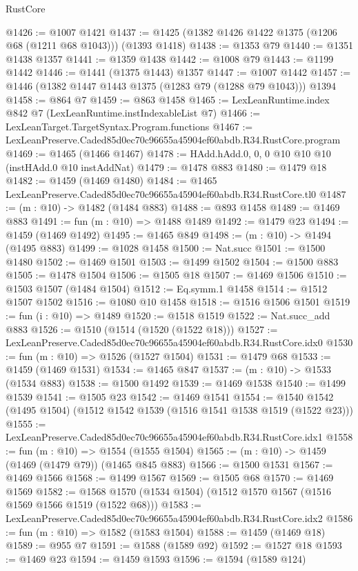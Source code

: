 \begin{lexlean}{RustCore}
\begin{coremodule}
@1426 := @1007 @1421
@1437 := @1425 (@1382 @1426 @1422 @1375 (@1206 @68 (@1211 @68 @1043))) (@1393 @1418)
@1438 := @1353 @79
@1440 := @1351 @1438 @1357
@1441 := @1359 @1438
@1442 := @1008 @79
@1443 := @1199 @1442
@1446 := @1441 (@1375 @1443) @1357
@1447 := @1007 @1442
@1457 := @1446 (@1382 @1447 @1443 @1375 (@1283 @79 (@1288 @79 @1043))) @1394
@1458 := @864 @7
@1459 := @863 @1458
@1465 := LexLeanRuntime.index @842 @7 (LexLeanRuntime.instIndexableList @7)
@1466 := LexLeanTarget.TargetSyntax.Program.functions
@1467 := LexLeanPreserve.Caded85d0ec70c96655a45904ef60abdb.R34.RustCore.program
@1469 := @1465 (@1466 @1467)
@1478 := HAdd.hAdd.{0, 0, 0} @10 @10 @10 (instHAdd.{0} @10 instAddNat)
@1479 := @1478 @883
@1480 := @1479 @18
@1482 := @1459 (@1469 @1480)
@1484 := @1465 LexLeanPreserve.Caded85d0ec70c96655a45904ef60abdb.R34.RustCore.tl0
@1487 := (m : @10) -> @1482 (@1484 @883)
@1488 := @893 @1458
@1489 := @1469 @883
@1491 := fun (m : @10) => @1488 @1489
@1492 := @1479 @23
@1494 := @1459 (@1469 @1492)
@1495 := @1465 @849
@1498 := (m : @10) -> @1494 (@1495 @883)
@1499 := @1028 @1458
@1500 := Nat.succ
@1501 := @1500 @1480
@1502 := @1469 @1501
@1503 := @1499 @1502
@1504 := @1500 @883
@1505 := @1478 @1504
@1506 := @1505 @18
@1507 := @1469 @1506
@1510 := @1503 @1507 (@1484 @1504)
@1512 := Eq.symm.{1} @1458
@1514 := @1512 @1507 @1502
@1516 := @1080 @10 @1458
@1518 := @1516 @1506 @1501
@1519 := fun (i : @10) => @1489
@1520 := @1518 @1519
@1522 := Nat.succ_add @883
@1526 := @1510 (@1514 (@1520 (@1522 @18)))
@1527 := LexLeanPreserve.Caded85d0ec70c96655a45904ef60abdb.R34.RustCore.idx0
@1530 := fun (m : @10) => @1526 (@1527 @1504)
@1531 := @1479 @68
@1533 := @1459 (@1469 @1531)
@1534 := @1465 @847
@1537 := (m : @10) -> @1533 (@1534 @883)
@1538 := @1500 @1492
@1539 := @1469 @1538
@1540 := @1499 @1539
@1541 := @1505 @23
@1542 := @1469 @1541
@1554 := @1540 @1542 (@1495 @1504) (@1512 @1542 @1539 (@1516 @1541 @1538 @1519 (@1522 @23)))
@1555 := LexLeanPreserve.Caded85d0ec70c96655a45904ef60abdb.R34.RustCore.idx1
@1558 := fun (m : @10) => @1554 (@1555 @1504)
@1565 := (m : @10) -> @1459 (@1469 (@1479 @79)) (@1465 @845 @883)
@1566 := @1500 @1531
@1567 := @1469 @1566
@1568 := @1499 @1567
@1569 := @1505 @68
@1570 := @1469 @1569
@1582 := @1568 @1570 (@1534 @1504) (@1512 @1570 @1567 (@1516 @1569 @1566 @1519 (@1522 @68)))
@1583 := LexLeanPreserve.Caded85d0ec70c96655a45904ef60abdb.R34.RustCore.idx2
@1586 := fun (m : @10) => @1582 (@1583 @1504)
@1588 := @1459 (@1469 @18)
@1589 := @955 @7
@1591 := @1588 (@1589 @92)
@1592 := @1527 @18
@1593 := @1469 @23
@1594 := @1459 @1593
@1596 := @1594 (@1589 @124)

\end{coremodule}
\end{lexlean}

